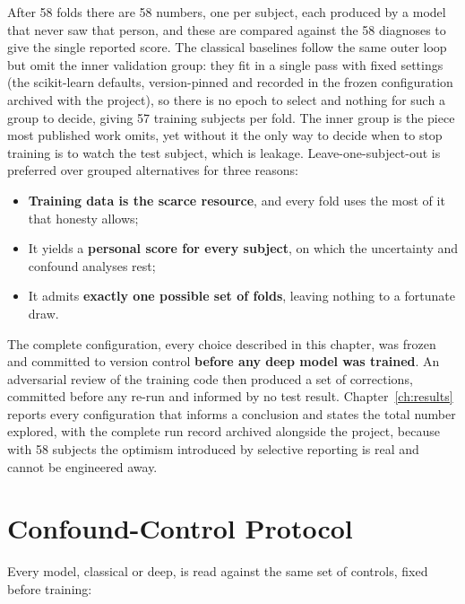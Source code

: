 After 58 folds there are 58 numbers, one per subject, each produced by a
model that never saw that person, and these are compared against the 58
diagnoses to give the single reported score. The classical baselines follow
the same outer loop but omit the inner validation group: they fit in a single
pass with fixed settings (the scikit-learn defaults, version-pinned and
recorded in the frozen configuration archived with the project), so there is
no epoch to select and nothing for such a group to decide, giving 57 training
subjects per fold. The inner group is
the piece most published work omits, yet without it the only way to decide
when to stop training is to watch the test subject, which is leakage.
Leave-one-subject-out is preferred over grouped alternatives for three reasons:

\begin{itemize}
  \item \textbf{Training data is the scarce resource}, and every fold uses
        the most of it that honesty allows;
  \item It yields a \textbf{personal score for every subject}, on which the
        uncertainty and confound analyses rest;
  \item It admits \textbf{exactly one possible set of folds}, leaving nothing
        to a fortunate draw.
\end{itemize}

The complete configuration, every choice described in this chapter, was
frozen and committed to version control \textbf{before any deep model was
trained}. An adversarial review of the training code then produced a set of
corrections, committed before any re-run and informed by no test result.
Chapter~\ref{ch:results} reports every configuration that informs a conclusion and states the
total number explored, with the complete run record archived alongside the
project, because with 58 subjects the optimism introduced by selective
reporting is real and cannot be engineered away.

\section{Confound-Control Protocol}
\label{sec:confounds}

Every model, classical or deep, is read against the same set of controls,
fixed before training:

